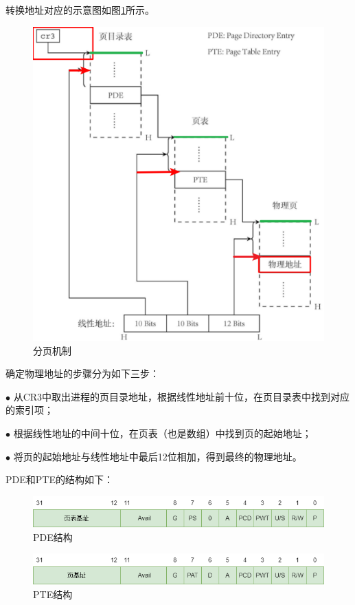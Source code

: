 \documentclass[UTF8,12pt]{ctexart}
\begin{document}
    转换地址对应的示意图如图\ref{分页机制}所示。
    \begin{figure}[H]
        \centering
        \includegraphics[width=12cm]{images/分页机制.png}
        \caption{分页机制}
        \label{分页机制}
    \end{figure}
    
    确定物理地址的步骤分为如下三步：
    
    $\bullet$ 从CR3中取出进程的页目录地址，根据线性地址前十位，在页目录表中找到对应的索引项；
    
    $\bullet$ 根据线性地址的中间十位，在页表（也是数组）中找到页的起始地址；
    
    $\bullet$ 将页的起始地址与线性地址中最后12位相加，得到最终的物理地址。
    
    PDE和PTE的结构如下：
    \begin{figure}[H]
        \centering
        \includegraphics[width=14cm]{images/PDE.png}
        \caption{PDE结构}
        \label{PDE}
    \end{figure}
    \begin{figure}[H]
        \centering
        \includegraphics[width=14cm]{images/PTE.png}
        \caption{PTE结构}
        \label{PTE}
    \end{figure}
    
\end{document}
